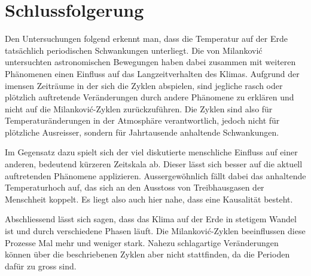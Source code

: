 %
%
%
%
\section{Schlussfolgerung
\label{milankovic:section:Schlussfolgerung}}

Den Untersuchungen folgend erkennt man, dass die Temperatur auf der Erde tatsächlich periodischen Schwankungen unterliegt.
Die von Milankovi\'c untersuchten astronomischen Bewegungen haben dabei zusammen mit weiteren Phänomenen einen Einfluss auf das Langzeitverhalten des Klimas.
Aufgrund der imensen Zeiträume in der sich die Zyklen abspielen, sind jegliche rasch oder plötzlich auftretende Veränderungen durch andere Phänomene zu erklären und nicht auf die Milankovi\'c-Zyklen zurückzuführen. 
Die Zyklen sind also für Temperaturänderungen in der Atmosphäre verantwortlich, jedoch nicht für plötzliche Ausreisser, sondern für Jahrtausende anhaltende Schwankungen.

Im Gegensatz dazu spielt sich der viel diskutierte menschliche Einfluss auf einer anderen, bedeutend kürzeren Zeitskala ab.
Dieser lässt sich besser auf die aktuell auftretenden Phänomene applizieren.
Aussergewöhnlich fällt dabei das anhaltende Temperaturhoch auf, das sich an den Ausstoss von Treibhausgasen der Menschheit koppelt.
Es liegt also auch hier nahe, dass eine Kausalität besteht.

Abschliessend lässt sich sagen, dass das Klima auf der Erde in stetigem Wandel ist und durch verschiedene Phasen läuft.
Die Milankovi\'c-Zyklen beeinflussen diese Prozesse Mal mehr und weniger stark.
Nahezu schlagartige Veränderungen können über die beschriebenen Zyklen aber nicht stattfinden, da die Perioden dafür zu gross sind.

